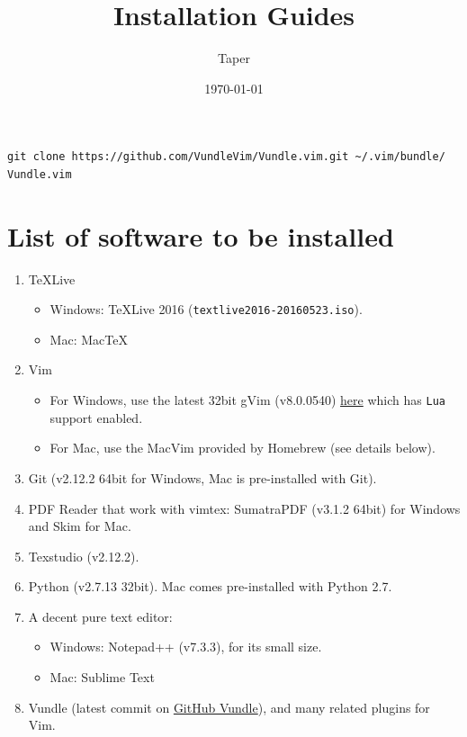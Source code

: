 \documentclass{article}
\title{Installation Guides}
\date{\today}
\author{Taper}
\begin{document}
\begin{lrbox}{\mybox}
\begin{lstlisting}
git clone https://github.com/VundleVim/Vundle.vim.git ~/.vim/bundle/ Vundle.vim
\end{lstlisting}
\end{lrbox}

\maketitle
{}    
\tableofcontents

\section{List of software to be installed}
\label{sec:list of software}

\begin{enumerate}
    \item \TeX Live 
        \begin{itemize}
            \item Windows: \TeX Live 2016 (\texttt{textlive2016-20160523.iso}).
            \item Mac: Mac\TeX
        \end{itemize}
    \item Vim 
        \begin{itemize}
            \item For Windows, use the latest 32bit gVim (v8.0.0540)
                \href{https://github.com/vim/vim-win32-installer/releases/}{here}
                which has \texttt{Lua} support enabled.
            \item For Mac, use the MacVim provided by Homebrew (see
                details below).
        \end{itemize}
    \item Git (v2.12.2 64bit for Windows, Mac is pre-installed with
        Git).
    \item PDF Reader that work with vimtex: SumatraPDF (v3.1.2 64bit)
        for Windows and Skim for Mac.
    \item Texstudio (v2.12.2).
    \item Python (v2.7.13 32bit). Mac comes pre-installed with Python
        2.7.
    \item A decent pure text editor:
        \begin{itemize}
            \item Windows: Notepad++ (v7.3.3), for its small size.
            \item Mac: Sublime Text
        \end{itemize}
    \item Vundle (latest commit on
        \href{https://github.com/VundleVim/Vundle.vim}{GitHub
        Vundle}), and many related plugins for Vim.
\end{enumerate}
\end{document}
